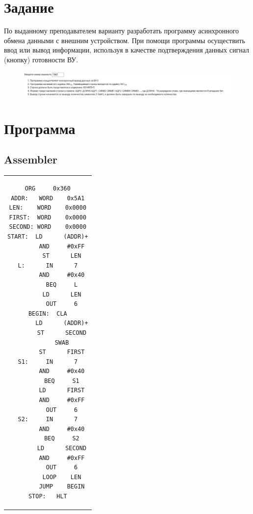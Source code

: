 

\section{Задание}
По выданному преподавателем варианту разработать программу асинхронного обмена данными с внешним устройством. При помощи
программы осуществить ввод или вывод информации, используя в качестве подтверждения данных сигнал (кнопку) готовности ВУ.


\begin{figure}[H]
    \centering
    \includegraphics[scale=0.35]{img/variant}
\end{figure}


\section{Программа}

\subsection{Assembler}

\begin{center}
    \begin{tabular}{c}
        \begin{lstlisting}[basicstyle=\ttfamily]
        ORG     0x360
ADDR:	WORD	0x5A1
LEN:	WORD	0x0000
FIRST:	WORD	0x0000
SECOND: WORD    0x0000
START:  LD      (ADDR)+
        AND     #0xFF
        ST      LEN
L:      IN      7
        AND     #0x40
        BEQ     L
        LD      LEN
        OUT     6
BEGIN:	CLA
        LD      (ADDR)+
        ST      SECOND
        SWAB
        ST      FIRST
S1:     IN      7
        AND     #0x40
        BEQ     S1
        LD      FIRST
        AND     #0xFF
        OUT     6
S2:     IN      7
        AND     #0x40
        BEQ     S2
        LD      SECOND
        AND     #0xFF
        OUT     6
        LOOP    LEN
        JUMP    BEGIN
STOP:	HLT

        \end{lstlisting}
    \end{tabular}
\end{center}

\newpage

